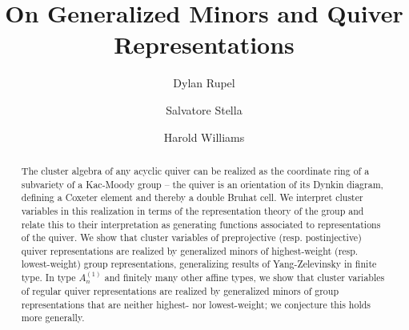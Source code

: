 \documentclass[12pt]{amsart}
\newcommand{\sayDR}[1]{\say[DR]{\color{red}{\bf DR:}\;#1}}
\theoremstyle{remark}
\numberwithin{equation}{section}
\numberwithin{figure}{section}
\begin{document}
\title{On Generalized Minors and Quiver Representations}

\author[Rupel]{Dylan Rupel}
\address[Dylan Rupel]{University of Notre Dame}

\author[Stella]{Salvatore Stella}
\address[Salvatore Stella]{Universit\`a degli studi di Roma ``La Sapienza''}

\author[Williams]{Harold Williams}
\address[Harold Williams]{University of Texas at Austin}

\begin{abstract}
The cluster algebra of any acyclic quiver can be realized as the coordinate ring of a subvariety of a Kac-Moody group -- the quiver is an orientation of its Dynkin diagram, defining a Coxeter element and thereby a double Bruhat cell.
We interpret cluster variables in this realization in terms of the representation theory of the group and relate this to their interpretation as generating functions associated to representations of the quiver.
We show that cluster variables of preprojective (resp. postinjective) quiver representations are realized by generalized minors of highest-weight (resp. lowest-weight) group representations, generalizing results of Yang-Zelevinsky in finite type.
In type $A_n^{\!(1)}$ and finitely many other affine types, we show that cluster variables of regular quiver representations are realized by generalized minors of group representations that are neither highest- nor lowest-weight; we conjecture this holds more generally.
\end{abstract}

\maketitle

\end{document}
